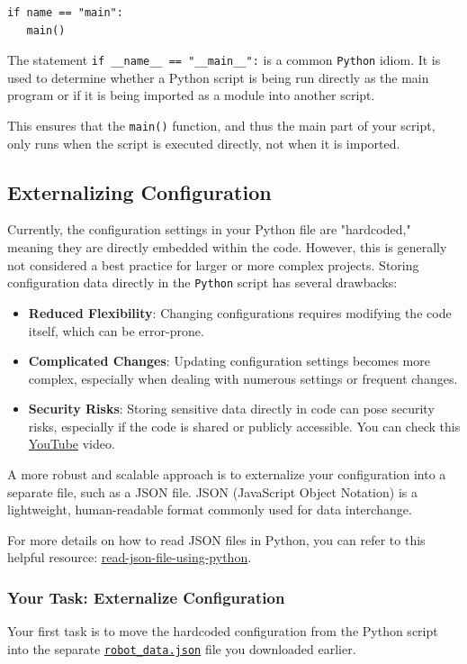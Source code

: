 \begin{verbatim}
if name == "main":
   main()
\end{verbatim}

The statement \texttt{if \_\_name\_\_ == "\_\_main\_\_":} is a common \texttt{Python} idiom. It is used to determine whether a Python script is being run directly as the main program or if it is being imported as a module into another script. 

This ensures that the \texttt{main()} function, and thus the main part of your script, only runs when the script is executed directly, not when it is imported.


\subsection{Externalizing Configuration}
Currently, the configuration settings in your Python file are "hardcoded," meaning they are directly embedded within the code. However, this is generally not considered a best practice for larger or more complex projects. Storing configuration data directly in the \texttt{Python} script has several drawbacks:

\begin{itemize}\setlength{\itemsep}{5pt}
\item \textbf{Reduced Flexibility}: Changing configurations requires modifying the code itself, which can be error-prone.
\item \textbf{Complicated Changes}: Updating configuration settings becomes more complex, especially when dealing with numerous settings or frequent changes.
\item \textbf{Security Risks}: Storing sensitive data directly in code can pose security risks, especially if the code is shared or publicly accessible. You can check this \href{https://youtu.be/WzpKB3poOBw}{YouTube} video.
\end{itemize}

A more robust and scalable approach is to externalize your configuration into a separate file, such as a JSON file. JSON (JavaScript Object Notation) is a lightweight, human-readable format commonly used for data interchange.

For more details on how to read JSON files in Python, you can refer to this helpful resource: \href{https://www.geeksforgeeks.org/read-json-file-using-python/}{read-json-file-using-python}.

\subsubsection{Your Task: Externalize Configuration}
Your first task is to move the hardcoded configuration from the Python script into the separate \href{https://github.com/balandongiv/computer_programming_gist/blob/main/session4/robot_data.json}{\texttt{robot\_data.json}} file you downloaded earlier.

